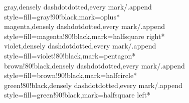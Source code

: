 \documentclass[a4paper]{article}
\begin{document}
{	gray,densely dashdotdotted,every mark/.append style={fill=gray!90!black},mark=oplus*\\
	magenta,densely dashdotdotted,every mark/.append style={fill=magenta!80!black},mark=halfsquare right*\\
	violet,densely dashdotdotted,every mark/.append style={fill=violet!80!black},mark=pentagon*\\
	brown!80!black,densely dashdotdotted,every mark/.append style={fill=brown!90!black},mark=halfcircle*\\
	green!80!black,densely dashdotdotted,every mark/.append style={fill=green!90!black},mark=halfsquare left*\\
}

\end{document}
